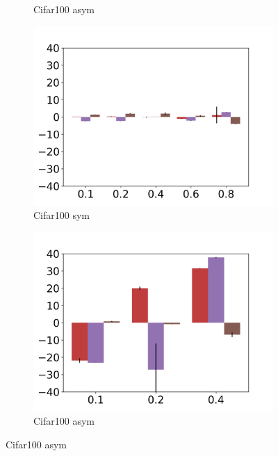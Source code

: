 \documentclass{article}
\begin{document}
\begin{figure}[htbp]
\begin{subfigure}[b]{0.245\textwidth}
    \vspace{-.5cm}
        \caption{Cifar100 asym}
        \label{cifar_asym:t}
    \end{subfigure}
    \begin{subfigure}[b]{0.245\textwidth}
        \includegraphics[width=\textwidth]{figs/cifar100NE_bar_mae.png}
    \vspace{-.5cm}
        \caption{Cifar100 sym}
    \end{subfigure}
    \begin{subfigure}[b]{0.245\textwidth}
        \includegraphics[width=\textwidth]{figs/cifar100NE_asym_bar_mae.png}
    \vspace{-.5cm}
        \caption{Cifar100 asym}
        \label{cifar_asym_2:t}

\end{subfigure}
\end{figure}
\end{document}
